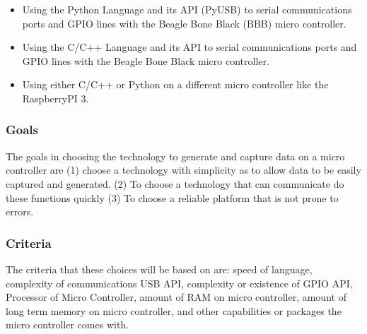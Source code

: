 \documentclass[10pt,draftclsnofoot,onecolumn]{IEEEtran}
\begin{document}
	\begin{itemize}
	\item Using the Python Language and its API (PyUSB) to serial communications ports and GPIO lines with the Beagle Bone Black (BBB) micro controller.
	\item Using the C/C++ Language and its API to serial communications ports and GPIO lines with the Beagle Bone Black micro controller.
	\item Using either C/C++ or Python on a different micro controller like the RaspberryPI 3.\\
	\end{itemize}

\subsubsection{Goals}
The goals in choosing the technology to generate and capture data on a micro controller are (1) choose a technology with simplicity as to allow data to be easily captured and generated. (2) To choose a technology that can communicate do these functions quickly (3) To choose a reliable platform that is not prone to errors. \\
\subsubsection{Criteria}
The criteria that these choices will be based on are: speed of language, complexity of communications USB API, complexity or existence of GPIO API, Processor of Micro Controller, amount of RAM on micro controller, amount of long term memory on micro controller, and other capabilities or packages the micro controller comes with.\\
\end{document}
